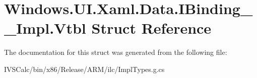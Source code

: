 \hypertarget{struct_windows_1_1_u_i_1_1_xaml_1_1_data_1_1_i_binding_____impl_1_1_vtbl}{}\section{Windows.\+U\+I.\+Xaml.\+Data.\+I\+Binding\+\_\+\+\_\+\+Impl.\+Vtbl Struct Reference}
\label{struct_windows_1_1_u_i_1_1_xaml_1_1_data_1_1_i_binding_____impl_1_1_vtbl}


The documentation for this struct was generated from the following file\+:\begin{DoxyCompactItemize}
\item 
I\+V\+S\+Calc/bin/x86/\+Release/\+A\+R\+M/ilc/Impl\+Types.\+g.\+cs\end{DoxyCompactItemize}
